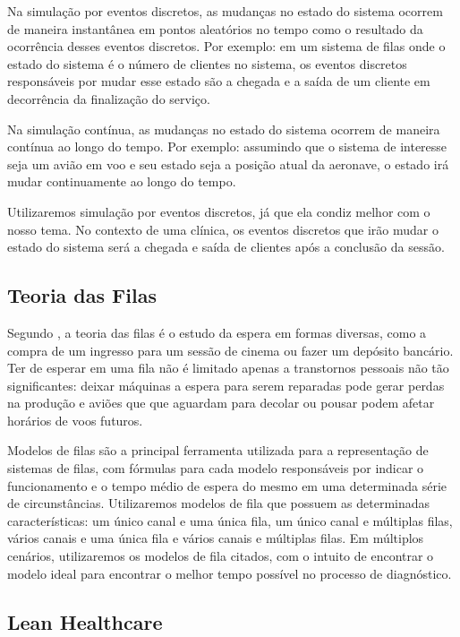 \documentclass[
    12pt,                %
    openright,           %
    oneside,             %
    a4paper,             %
    english,             %
    brazil               %
]{abntex2}
\begin{document}
Na simulação por eventos discretos, as mudanças no estado do sistema ocorrem de maneira instantânea em pontos aleatórios no tempo como o resultado da ocorrência desses eventos discretos. Por exemplo: em um sistema de filas onde o estado do sistema é o número de clientes no sistema, os eventos discretos responsáveis por mudar esse estado são a chegada e a saída de um cliente em decorrência da finalização do serviço.

Na simulação contínua, as mudanças no estado do sistema ocorrem de maneira contínua ao longo do tempo. Por exemplo: assumindo que o sistema de interesse seja um avião em voo e seu estado seja a posição atual da aeronave, o estado irá mudar continuamente ao longo do tempo.

Utilizaremos simulação por eventos discretos, já que ela condiz melhor com o nosso tema. No contexto de uma clínica, os eventos discretos que irão mudar o estado do sistema será a chegada e saída de clientes após a conclusão da sessão.

\subsection{Teoria das Filas}

Segundo , a teoria das filas é o estudo da espera em formas diversas, como a compra de um ingresso para um sessão de cinema ou fazer um depósito bancário. Ter de esperar em uma fila não é limitado apenas a transtornos pessoais não tão significantes: deixar máquinas a espera para serem reparadas pode gerar perdas na produção e aviões que que aguardam para decolar ou pousar podem afetar horários de voos futuros.

Modelos de filas são a principal ferramenta utilizada para a representação de sistemas de filas, com fórmulas para cada modelo responsáveis por indicar o funcionamento e o tempo médio de espera do mesmo em uma determinada série de circunstâncias. Utilizaremos modelos de fila que possuem as determinadas características: um único canal e uma única fila, um único canal e múltiplas filas, vários canais e uma única fila e vários canais e múltiplas filas. Em múltiplos cenários, utilizaremos os modelos de fila citados, com o intuito de encontrar o modelo ideal para encontrar o melhor tempo possível no processo de diagnóstico.

\subsection{Lean Healthcare}
\end{document}

